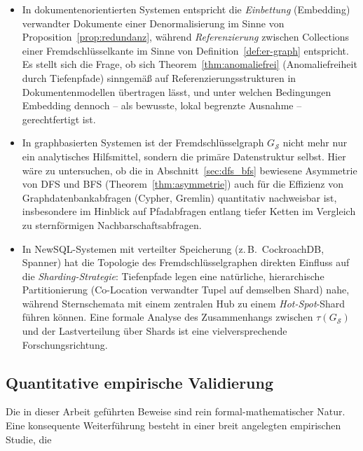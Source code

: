 ﻿\documentclass[a4paper,12pt]{report}
\theoremstyle{definition}
\theoremstyle{remark}
\begin{document}
\begin{itemize}
  \item In dokumentenorientierten Systemen entspricht die
    \emph{Einbettung} (Embedding) verwandter Dokumente einer
    Denormalisierung im Sinne von Proposition~\ref{prop:redundanz},
    während \emph{Referenzierung} zwischen Collections einer
    Fremdschlüsselkante im Sinne von Definition~\ref{def:er-graph}
    entspricht. Es stellt sich die Frage, ob sich
    Theorem~\ref{thm:anomaliefrei} (Anomaliefreiheit durch
    Tiefenpfade) sinngemäß auf Referenzierungsstrukturen in
    Dokumentenmodellen übertragen lässt, und unter welchen Bedingungen
    Embedding dennoch -- als bewusste, lokal begrenzte Ausnahme --
    gerechtfertigt ist.
  \item In graphbasierten Systemen ist der Fremdschlüsselgraph
    $G_{\mathcal{S}}$ nicht mehr nur ein analytisches Hilfsmittel,
    sondern die primäre Datenstruktur selbst. Hier wäre zu
    untersuchen, ob die in Abschnitt~\ref{sec:dfs_bfs} bewiesene
    Asymmetrie von DFS und BFS (Theorem~\ref{thm:asymmetrie}) auch für
    die Effizienz von Graphdatenbankabfragen (Cypher, Gremlin)
    quantitativ nachweisbar ist, insbesondere im Hinblick auf
    Pfadabfragen entlang tiefer Ketten im Vergleich zu
    sternförmigen Nachbarschaftsabfragen.
  \item In NewSQL-Systemen mit verteilter Speicherung (z.\,B.\
    CockroachDB, Spanner) hat die Topologie des Fremdschlüsselgraphen
    direkten Einfluss auf die \emph{Sharding-Strategie}: Tiefenpfade
    legen eine natürliche, hierarchische Partitionierung
    (Co-Location verwandter Tupel auf demselben Shard) nahe, während
    Sternschemata mit einem zentralen Hub zu einem
    \emph{Hot-Spot}-Shard führen können. Eine formale Analyse des
    Zusammenhangs zwischen $\tau(G_{\mathcal{S}})$ und der
    Lastverteilung über Shards ist eine vielversprechende
    Forschungsrichtung.
\end{itemize}

\subsection{Quantitative empirische Validierung}
\label{sec:ausblick-empirie}

Die in dieser Arbeit geführten Beweise sind rein formal-mathematischer
Natur. Eine konsequente Weiterführung besteht in einer breit angelegten
empirischen Studie, die
\end{document}
